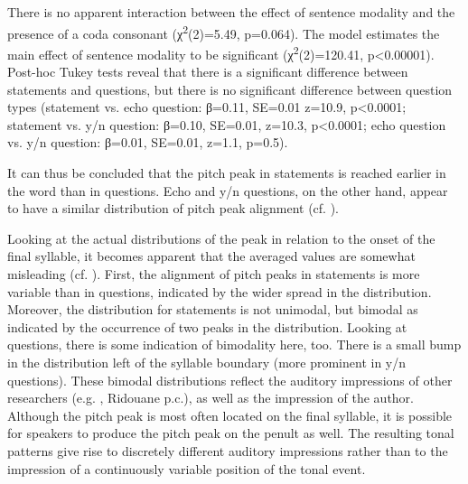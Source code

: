 There is no apparent interaction between the effect of sentence modality and the presence of a coda consonant (χ\textsuperscript{2}(2)=5.49, p=0.064). The model estimates the main effect of sentence modality to be significant (χ\textsuperscript{2}(2)=120.41, p<0.00001). Post-hoc Tukey tests reveal that there is a significant difference between statements and questions, but there is no significant difference between question types (statement vs. echo question: β=0.11, SE=0.01 z=10.9, p<0.0001; statement vs. y/n question: β=0.10, SE=0.01, z=10.3, p<0.0001; echo question vs. y/n question: β=0.01, SE=0.01, z=1.1, p=0.5).

It can thus be concluded that the pitch peak in statements is reached earlier in the word than in questions. Echo and y/n questions, on the other hand, appear to have a similar distribution of pitch peak alignment (cf. ).

Looking at the actual distributions of the peak in relation to the onset of the final syllable, it becomes apparent that the averaged values are somewhat misleading (cf. ). First, the alignment of pitch peaks in statements is more variable than in questions, indicated by the wider spread in the distribution. Moreover, the distribution for statements is not unimodal, but bimodal as indicated by the occurrence of two peaks in the distribution. Looking at questions, there is some indication of bimodality here, too. There is a small bump in the distribution left of the syllable boundary (more prominent in y/n questions). These bimodal distributions reflect the auditory impressions of other researchers (e.g. \citealt{DE1985}, Ridouane p.c.), as well as the impression of the author. Although the pitch peak is most often located on the final syllable, it is possible for speakers to produce the pitch peak on the penult as well. The resulting tonal patterns give rise to discretely different auditory impressions rather than to the impression of a continuously variable position of the tonal event. 

